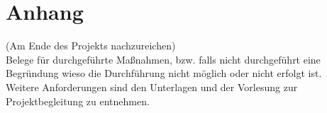 \documentclass[accentcolor=tud9c,12pt,paper=a4]{tudreport}
\begin{document}
\appendix
	\chapter{Anhang}
		(Am Ende des Projekts nachzureichen)\\
		Belege für durchgeführte Maßnahmen, bzw. falls nicht durchgeführt eine Begründung 
		wieso die Durchführung nicht möglich oder nicht erfolgt ist. \\
		Weitere Anforderungen sind den Unterlagen und der Vorlesung zur Projektbegleitung 
		zu entnehmen.
\end{document}
